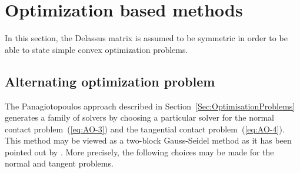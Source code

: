 



 

\section{Optimization based methods}
\label{Sec:OptimisationBasedMethods}

In this section, the Delassus matrix is assumed to be symmetric in order to be able to state simple convex optimization problems.

\subsection{Alternating optimization problem}

The Panagiotopoulos approach described in Section~\ref{Sec:OptimisationProblems} generates a family of solvers by choosing a particular solver for the normal contact problem~(\ref{eq:AO-3}) and the tangential contact problem~(\ref{eq:AO-4}). This method may be viewed as a two-block Gauss-Seidel method as it has been pointed out by \cite{Tzaferopoulos_CS1993}. More precisely, the following choices may be made for the normal and tangent problems.

